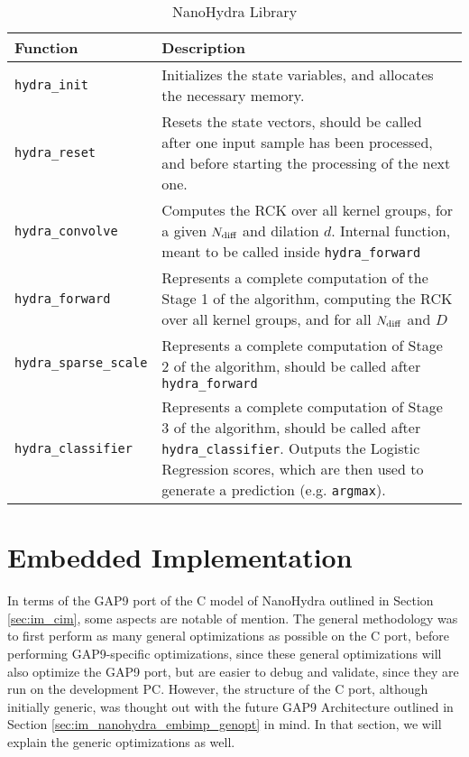     \begin{table}[h!]
    \begin{tabular}{||p{1.5in}|p{4in}||}
        \hline
        Function & Description  \\

        \hline\hline
        \verb|hydra_init| & Initializes the state variables, and allocates the necessary memory. \\
        \hline
        \verb|hydra_reset| & Resets the state vectors, should be called after one input sample has been processed, and before starting the processing of the next one. \\
        \hline
        \verb|hydra_convolve|   & Computes the RCK over all kernel groups, for a given $N\sb{\text{diff}}$ and dilation $d$. Internal function, meant to be called inside \verb|hydra_forward|\\
        \hline
        \verb|hydra_forward|   & Represents a complete computation of the Stage 1 of the algorithm, computing the RCK over all kernel groups, and for all $N\sb{\text{diff}}$ and $D$\\
        \hline
        \verb|hydra_sparse_scale|   & Represents a complete computation of Stage 2 of the algorithm, should be called after \verb|hydra_forward|\\
        \hline
        \verb|hydra_classifier|     & Represents a complete computation of Stage 3 of the algorithm, should be called after \verb|hydra_classifier|. Outputs the Logistic Regression scores, which are then used to generate a prediction (e.g. \verb|argmax|).\\
        \hline
    \end{tabular}
    \caption{NanoHydra Library}
    \label{tbl:library_c}
    \end{table}

    \section{Embedded Implementation}\label{sec:im_nanohydra_embimp}

        In terms of the GAP9 port of the C model of NanoHydra outlined in Section \ref{sec:im_cim}, some aspects are notable of mention. The general methodology was to first perform
        as many general optimizations as possible on the C port, before performing GAP9-specific optimizations, since these general optimizations will also optimize the GAP9 port, but
        are easier to debug and validate, since they are run on the development PC. However, the structure of the C port, although initially generic, was thought out with the future GAP9 Architecture outlined in Section \ref{sec:im_nanohydra_embimp_genopt} in mind.
        In that section, we will explain the generic optimizations as well.

